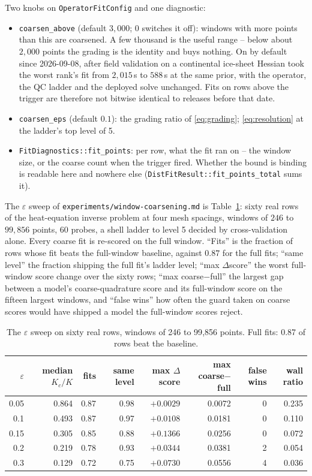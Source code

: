 \documentclass[11pt]{article}
\newcommand{\eps}{\varepsilon}
\newcommand{\code}[1]{\texttt{#1}}
\begin{document}
Two knobs on \code{OperatorFitConfig} and one diagnostic:
\begin{itemize}
\item \code{coarsen\_above} (default $3{,}000$; $0$ switches it off):
  windows with more points than this are coarsened. A few thousand is the
  useful range -- below about $2{,}000$ points the grading is the identity and
  buys nothing. On by default since 2026-09-08, after field validation on a
  continental ice-sheet Hessian took the worst rank's fit from $2{,}015$\,s to
  $588$\,s at the same prior, with the operator, the QC ladder and the
  deployed solve unchanged. Fits on rows above the trigger are therefore not
  bitwise identical to releases before that date.
\item \code{coarsen\_eps} (default $0.1$): the grading ratio of
  \eqref{eq:grading}; \eqref{eq:resolution} at the ladder's top level of 5.
\item \code{FitDiagnostics::fit\_points}: per row, what the fit ran on --
  the window size, or the coarse count when the trigger fired. Whether the
  bound is binding is readable here and nowhere else
  (\code{DistFitResult::fit\_points\_total} sums it).
\end{itemize}
The $\eps$ sweep of \code{experiments/window-coarsening.md} is
Table~\ref{tab:sweep}: sixty real rows of the heat-equation inverse problem
at four mesh spacings, windows of $246$ to $99{,}856$ points, 60 probes, a
shell ladder to level 5 decided by cross-validation alone. Every coarse fit is re-scored on the full window.
``Fits'' is the fraction of rows whose fit beats the full-window baseline,
against $0.87$ for the full fits; ``same level'' the fraction shipping the
full fit's ladder level; ``max $\Delta$score'' the worst full-window score
change over the sixty rows; ``max coarse$-$full'' the largest gap
between a model's coarse-quadrature score and its full-window score on the
fifteen largest windows, and ``false wins'' how often the guard taken on
coarse scores would have shipped a model the full-window scores reject.

\begin{table}[ht]
\centering
\small
\begin{tabular}{@{}rrrrrrrr@{}}
\toprule
$\eps$ & median $K_c/K$ & fits & same level & max $\Delta$score
     & max coarse$-$full & false wins & wall ratio \\
\midrule
0.05 & 0.864 & 0.87 & 0.98 & $+0.0029$ & 0.0072 & 0 & 0.235 \\
0.1  & 0.493 & 0.87 & 0.97 & $+0.0108$ & 0.0181 & 0 & 0.110 \\
0.15 & 0.305 & 0.85 & 0.88 & $+0.1366$ & 0.0256 & 0 & 0.072 \\
0.2  & 0.219 & 0.78 & 0.93 & $+0.0344$ & 0.0381 & 2 & 0.054 \\
0.3  & 0.129 & 0.72 & 0.75 & $+0.0730$ & 0.0556 & 4 & 0.036 \\
\bottomrule
\end{tabular}
\caption{The $\eps$ sweep on sixty real rows, windows of 246 to 99{,}856
points. Full fits: 0.87 of rows beat the baseline.}
\label{tab:sweep}
\end{table}
\end{document}
